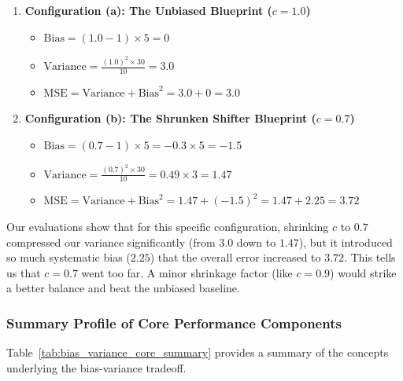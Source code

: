 \documentclass{article}
\begin{document}
\begin{enumerate}
    \item \textbf{Configuration (a): The Unbiased Blueprint ($c = 1.0$)}
    \begin{itemize}
        \item $\text{Bias} = (1.0 - 1) \times 5 = 0$
        \item $\text{Variance} = \frac{(1.0)^2 \times 30}{10} = 3.0$
        \item $\text{MSE} = \text{Variance} + \text{Bias}^2 = 3.0 + 0 = \mathbf{3.0}$
    \end{itemize}
    
    \item \textbf{Configuration (b): The Shrunken Shifter Blueprint ($c = 0.7$)}
    \begin{itemize}
        \item $\text{Bias} = (0.7 - 1) \times 5 = -0.3 \times 5 = -1.5$
        \item $\text{Variance} = \frac{(0.7)^2 \times 30}{10} = 0.49 \times 3 = 1.47$
        \item $\text{MSE} = \text{Variance} + \text{Bias}^2 = 1.47 + (-1.5)^2 = 1.47 + 2.25 = \mathbf{3.72}$
    \end{itemize}
\end{enumerate}

Our evaluations show that for this specific configuration, shrinking $c$ to $0.7$ compressed our variance significantly (from $3.0$ down to $1.47$), but it introduced so much systematic bias ($2.25$) that the overall error increased to $3.72$. This tells us that $c=0.7$ went too far. A minor shrinkage factor (like $c=0.9$) would strike a better balance and beat the unbiased baseline.

\subsubsection{Summary Profile of Core Performance Components}
Table~\ref{tab:bias_variance_core_summary} provides a summary of the concepts underlying the bias-variance tradeoff.
\end{document}
